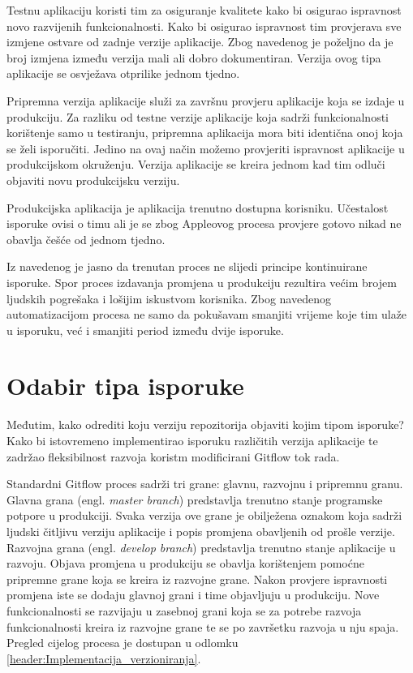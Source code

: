 \documentclass[times, utf8, diplomski, numeric]{fer}
\newcommand{\eng}[1]{(engl. \textit{#1})}
\begin{document}
Testnu aplikaciju koristi tim za osiguranje kvalitete kako bi osigurao ispravnost novo razvijenih funkcionalnosti. Kako bi osigurao ispravnost tim provjerava sve izmjene ostvare od zadnje verzije aplikacije. Zbog navedenog je poželjno da je broj izmjena između verzija mali ali dobro dokumentiran. Verzija ovog tipa aplikacije se osvježava otprilike jednom tjedno.

Pripremna verzija aplikacije služi za završnu provjeru aplikacije koja se izdaje u produkciju. Za razliku od testne verzije aplikacije koja sadrži funkcionalnosti korištenje samo u testiranju, pripremna aplikacija mora biti identična onoj koja se želi isporučiti. Jedino na ovaj način možemo provjeriti ispravnost aplikacije u produkcijskom okruženju. Verzija aplikacije se kreira jednom kad tim odluči objaviti novu produkcijsku verziju.

Produkcijska aplikacija je aplikacija trenutno dostupna korisniku. Učestalost isporuke ovisi o timu ali je se zbog Appleovog procesa provjere gotovo nikad ne obavlja češće od jednom tjedno.

Iz navedenog je jasno da trenutan proces ne slijedi principe kontinuirane isporuke. Spor proces izdavanja promjena u produkciju rezultira većim brojem ljudskih pogrešaka i lošijim iskustvom korisnika. Zbog navedenog automatizacijom procesa ne samo da pokušavam smanjiti vrijeme koje tim ulaže u isporuku, već i smanjiti period između dvije isporuke.


\section{Odabir tipa isporuke}

Međutim, kako odrediti koju verziju repozitorija objaviti kojim tipom isporuke? Kako bi istovremeno implementirao isporuku različitih verzija aplikacije te zadržao fleksibilnost razvoja koristm modificirani Gitflow tok rada.

Standardni Gitflow proces sadrži tri grane: glavnu, razvojnu i pripremnu granu. Glavna grana \eng{master branch} predstavlja trenutno stanje programske potpore u produkciji. Svaka verzija ove grane je obilježena oznakom koja sadrži ljudski čitljivu verziju aplikacije i popis promjena obavljenih od prošle verzije. Razvojna grana \eng{develop branch} predstavlja trenutno stanje aplikacije u razvoju. Objava promjena u produkciju se obavlja korištenjem pomoćne pripremne grane koja se kreira iz razvojne grane. Nakon provjere ispravnosti promjena iste se dodaju glavnoj grani i time objavljuju u produkciju. Nove funkcionalnosti se razvijaju u zasebnoj grani koja se za potrebe razvoja funkcionalnosti kreira iz razvojne grane te se po završetku razvoja u nju spaja. Pregled cijelog procesa je dostupan u odlomku \ref{header:Implementacija_verzioniranja}.
\end{document}

